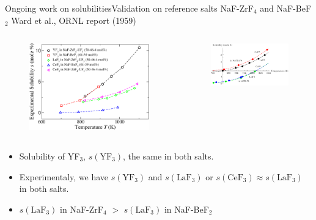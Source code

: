 \documentclass{beamer}
\begin{document}
\begin{frame}{Ongoing work on solubilities}{Validation on reference salts NaF-ZrF$_4$ and NaF-BeF$_2$}
    \scriptsize{Ward et al., ORNL report (1959)}
    \begin{columns}
        \begin{column}{6cm}
            \begin{figure}
                \includegraphics[width=\textwidth]{ward_et_al_solubilities}
            \end{figure}
        \end{column}
        \begin{column}{6cm}
            \begin{figure}
                \includegraphics[width=\textwidth]{CeF3vsLaF3}
            \end{figure}
        \end{column}
    \end{columns}
    \begin{itemize}
        \item Solubility of YF$_3$, $s(\text{YF}_3)$, the same in both salts.
        \item Experimentaly, we have $s(\text{YF}_3)$ and $s(\text{LaF}_3)$ or $s(\text{CeF}_3)\approx s(\text{LaF}_3)$ in both salts.
        \item $s(\text{LaF}_3)$ in NaF-ZrF$_4$ $>$ $s(\text{LaF}_3)$ in NaF-BeF$_2$
    \end{itemize}
\end{frame}
\end{document}
